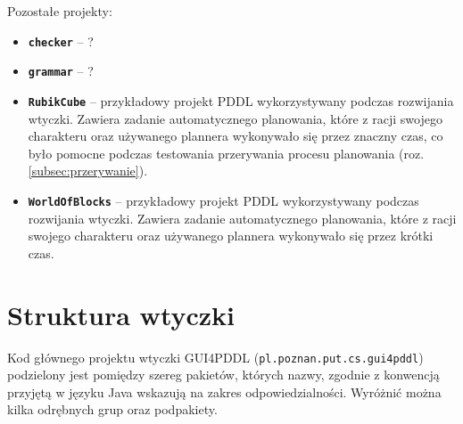 Pozostałe projekty:
\begin{itemize}
\item \textbf{\texttt{checker}} -- ?
\item \textbf{\texttt{grammar}} -- ?
\item \textbf{\texttt{RubikCube}} -- przykładowy projekt PDDL wykorzystywany podczas rozwijania wtyczki. Zawiera zadanie automatycznego planowania, które z racji swojego charakteru oraz używanego plannera wykonywało się przez znaczny czas, co było pomocne podczas testowania przerywania procesu planowania (roz. \ref{subsec:przerywanie}).
\item \textbf{\texttt{WorldOfBlocks}} -- przykładowy projekt PDDL wykorzystywany podczas rozwijania wtyczki. Zawiera zadanie automatycznego planowania, które z racji swojego charakteru oraz używanego plannera wykonywało się przez krótki czas.
\end{itemize}

\section{Struktura wtyczki}
\label{sec:struktura}

Kod głównego projektu wtyczki GUI4PDDL (\texttt{pl.poznan.put.cs.gui4pddl}) podzielony jest pomiędzy szereg pakietów, których nazwy, zgodnie z konwencją przyjętą w języku Java wskazują na zakres odpowiedzialności. Wyróżnić można kilka odrębnych grup oraz podpakiety.

